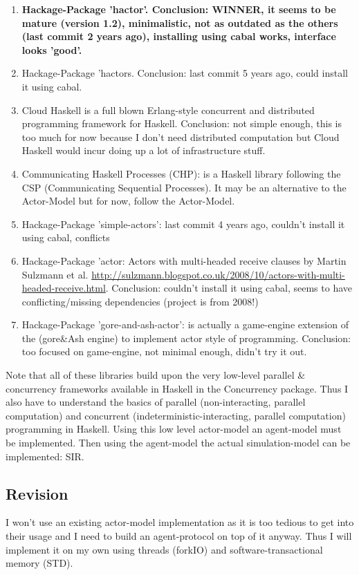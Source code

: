 \begin{enumerate}
\item \textbf{Hackage-Package 'hactor'. Conclusion: WINNER, it seems to be mature (version 1.2), minimalistic, not as outdated as the others (last commit 2 years ago), installing using cabal works, interface looks 'good'.}
\item Hackage-Package 'hactors. Conclusion: last commit 5 years ago, could install it using cabal.
\item Cloud Haskell is a full blown Erlang-style concurrent and distributed programming framework for Haskell. Conclusion: not simple enough, this is too much for now because I don't need distributed computation but Cloud Haskell would incur doing up a lot of infrastructure stuff.
\item Communicating Haskell Processes (CHP): is a Haskell library following the CSP (Communicating Sequential Processes). It may be an alternative to the Actor-Model but for now, follow the Actor-Model.
\item Hackage-Package 'simple-actors': last commit 4 years ago, couldn't install it using cabal, conflicts
\item Hackage-Package 'actor: Actors with multi-headed receive clauses by Martin Sulzmann et al. \url{http://sulzmann.blogspot.co.uk/2008/10/actors-with-multi-headed-receive.html}. Conclusion: couldn't install it using cabal, seems to have conflicting/missing dependencies (project is from 2008!)
\item Hackage-Package 'gore-and-ash-actor': is actually a game-engine extension of the (gore\&Ash engine) to implement actor style of programming. Conclusion: too focused on game-engine, not minimal enough, didn't try it out.
\end{enumerate}

Note that all of these libraries build upon the very low-level parallel \& concurrency frameworks available in Haskell in the Concurrency package. Thus I also have to understand the basics of parallel (non-interacting, parallel computation) and concurrent (indeterministic-interacting, parallel computation) programming in Haskell. Using this low level actor-model an agent-model must be implemented. Then using the agent-model the actual simulation-model can be implemented: SIR.

\subsection*{Revision}
I won't use an existing actor-model implementation as it is too tedious to get into their usage and I need to build an agent-protocol on top of it anyway. Thus I will implement it on my own using threads (forkIO) and software-transactional memory (STD).